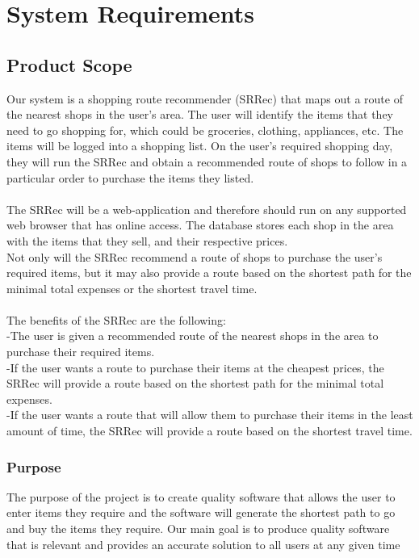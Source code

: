 \documentclass[12pt]{article}
\begin{document}
 \section{System Requirements}
 \subsection{Product Scope} 
Our system is a shopping route recommender (SRRec) that maps out a route of the nearest shops in the user's area. The user will identify the items that they need to go shopping for, which could be groceries, clothing, appliances, etc. The items will be logged into a shopping list. On the user's required shopping day, they will run the SRRec and obtain a recommended route of shops to follow in a particular order to purchase the items they listed.\\\\
The SRRec will be a web-application and therefore should run on any supported web browser that has online access. The database stores each shop in the area with the items that they sell, and their respective prices.\\
Not only will the SRRec recommend a route of shops to purchase the user's required items, but it may also provide a route based on the shortest path for the minimal total expenses or the shortest travel time.\\\\
The benefits of the SRRec are the following:\\
-The user is given a recommended route of the nearest shops in the area to purchase their required items.\\
-If the user wants a route to purchase their items at the cheapest prices, the SRRec will provide a route based on the shortest path for the minimal total expenses.\\
-If the user wants a route that will allow them to purchase their items in the least amount of time, the SRRec will provide a route based on the shortest travel time.

\subsubsection{Purpose}
The purpose of the project is to create quality software that allows 
the user to enter items they require and the software will generate the shortest
path to go and buy the items they require. Our main goal is to produce quality software
that is relevant and provides an accurate solution to all users at any given time
\end{document}
